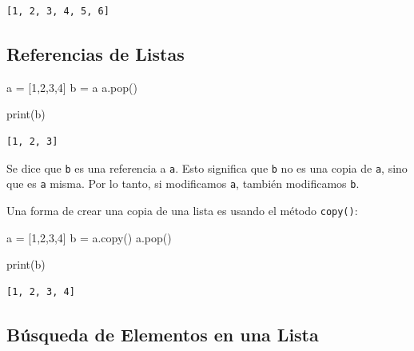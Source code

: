 \documentclass[
  letterpaper,
  DIV=11,
  numbers=noendperiod]{scrreprt}
\newenvironment{Shaded}{\begin{snugshade}}{\end{snugshade}}
\newcommand{\BuiltInTok}[1]{\textcolor[rgb]{0.00,0.23,0.31}{#1}}
\newcommand{\DecValTok}[1]{\textcolor[rgb]{0.68,0.00,0.00}{#1}}
\newcommand{\NormalTok}[1]{\textcolor[rgb]{0.00,0.23,0.31}{#1}}
\newcommand{\OperatorTok}[1]{\textcolor[rgb]{0.37,0.37,0.37}{#1}}
\begin{document}
\begin{verbatim}
[1, 2, 3, 4, 5, 6]
\end{verbatim}

\hypertarget{referencias-de-listas}{%
\subsection{Referencias de Listas}\label{referencias-de-listas}}

\begin{Shaded}
\begin{Highlighting}[]
\NormalTok{a }\OperatorTok{=}\NormalTok{ [}\DecValTok{1}\NormalTok{,}\DecValTok{2}\NormalTok{,}\DecValTok{3}\NormalTok{,}\DecValTok{4}\NormalTok{]}
\NormalTok{b }\OperatorTok{=}\NormalTok{ a}
\NormalTok{a.pop()}

\BuiltInTok{print}\NormalTok{(b)}
\end{Highlighting}
\end{Shaded}

\begin{verbatim}
[1, 2, 3]
\end{verbatim}

Se dice que \texttt{b} es una referencia a \texttt{a}. Esto significa
que \texttt{b} no es una copia de \texttt{a}, sino que es \texttt{a}
misma. Por lo tanto, si modificamos \texttt{a}, también modificamos
\texttt{b}.

Una forma de crear una copia de una lista es usando el método
\texttt{copy()}:

\begin{Shaded}
\begin{Highlighting}[]
\NormalTok{a }\OperatorTok{=}\NormalTok{ [}\DecValTok{1}\NormalTok{,}\DecValTok{2}\NormalTok{,}\DecValTok{3}\NormalTok{,}\DecValTok{4}\NormalTok{]}
\NormalTok{b }\OperatorTok{=}\NormalTok{ a.copy()}
\NormalTok{a.pop()}

\BuiltInTok{print}\NormalTok{(b)}
\end{Highlighting}
\end{Shaded}

\begin{verbatim}
[1, 2, 3, 4]
\end{verbatim}

\hypertarget{buxfasqueda-de-elementos-en-una-lista}{%
\subsection{Búsqueda de Elementos en una
Lista}\label{buxfasqueda-de-elementos-en-una-lista}}
\end{document}
